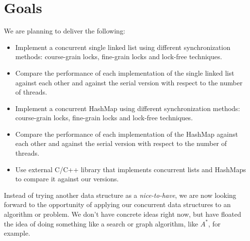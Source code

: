 \documentclass[11pt]{article}
\begin{document}
\section*{Goals}
We are planning to deliver the following:
\begin{itemize}
\item
Implement a concurrent single linked list using different
synchronization methods: course-grain locks, fine-grain locks and lock-free
techniques.
\item Compare the performance of each implementation of the single
linked list against each other and against the serial version with respect to
the number of threads.
\item Implement a concurrent HashMap using different synchronization methods:
course-grain locks, fine-grain locks and lock-free techniques.
\item Compare the performance of each implementation of the HashMap against
each other and against the serial version with respect to the number of threads.
\item Use external C/C++ library that implements concurrent lists and
HashMaps to compare it against our versions.
\end{itemize}

Instead of trying another data structure as a {\it nice-to-have}, we are now
looking forward to the opportunity of applying our concurrent data structures to
an algorithm or problem. We don't have concrete ideas right now, but have
floated the idea of doing something like a search or graph algorithm, like
$A^*$, for example.
\end{document}
